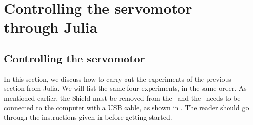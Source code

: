 \section{Controlling the servomotor through Julia}
\subsection{Controlling the servomotor}
\label{sec:servo-julia}
In this section, we discuss how to carry out the experiments of the
previous section from Julia.  We will list the same four experiments,
in the same order. As mentioned earlier, the Shield must be removed from 
the \arduino\ and the \arduino\ needs to be connected to the computer 
with a USB cable, as shown in . 
The reader should go through the instructions given in  before getting started.


